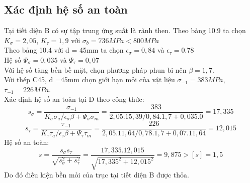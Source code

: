 \subsection{Xác định hệ số an toàn}
Tại tiết diện B có sự tập trung ứng suất là rãnh then. Theo bảng 10.9 ta chọn $K_\sigma =2,05$, $K_\tau = 1,9$ với $\sigma_b = 736MPa < 800MPa$ \\
Theo bảng 10.4 với d = 45mm ta chọn $\epsilon_\sigma = 0,84$ và $\epsilon_\tau = 0.78$ \\
Hệ số $\Psi_\sigma = 0,035$ và $\Psi_\tau = 0,07$ \\ 
Với hệ số tăng bền bề mặt, chọn phương pháp phun bi nên $\beta = 1,7$. \\
Với thép C45, d =45mm chọn giới hạn mỏi của vật liệu $\sigma_{-1} = 383MPa$, $\tau_{-1} = 226MPa$. \\
Xác định hệ số an toàn tại D theo công thức:
\[
    s_\sigma = \frac{\sigma_{-1}}{K_\sigma \sigma_a / \epsilon_\sigma \beta + \Psi_\sigma \sigma_m} = \frac{383}{2,05.15,39/0,84.1,7 + 0,035.0} = 17,335
\]
\[
    s_\tau = \frac{\tau_{-1}}{K_\tau \tau_a / \epsilon_\tau \beta + \Psi_\tau \tau_m} = \frac{226}{2,05.11,64/0,78.1,7 + 0,07.11,64} = 12,015
\]
Hệ số an toàn:
\[
    s = \frac{s_\sigma s_\tau}{\sqrt{s_\sigma^2 + s_\tau^2}} = \frac{17,335.12,015}{\sqrt{17,335^2 + 12,015^2}} = 9,875 > [s] = 1,5
\]
Do đó điều kiện bền mỏi của trục tại tiết diện B được thỏa.
\cleardoublepage